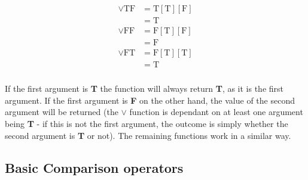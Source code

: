 \documentclass[Master.tex]{subfiles}
\begin{document}
\begin{gather*}
\begin{aligned}
\vee \bm{\mathrm{TF}} &= \bm{\mathrm{T}}[\bm{\mathrm{T}}][\bm{\mathrm{F}}] \\
&= \bm{\mathrm{T}} \\
\vee \bm{\mathrm{FF}} &= \bm{\mathrm{F}}[\bm{\mathrm{T}}][\bm{\mathrm{F}}] \\
&= \bm{\mathrm{F}} \\
\vee \bm{\mathrm{FT}} &= \bm{\mathrm{F}}[\bm{\mathrm{T}}][\bm{\mathrm{T}}] \\
&= \bm{\mathrm{T}} \\
\end{aligned}
\end{gather*}

If the first argument is \textbf{T} the function will always return \textbf{T}, as it is the first argument. If the first argument is \textbf{F} on the other hand, the value of the second argument will be returned (the $\vee$ function is dependant on at least one argument being \textbf{T} - if this is not the first argument, the outcome is simply whether the second argument is \textbf{T} or not). The remaining functions work in a similar way.

\subsection{Basic Comparison operators}
\end{document}
